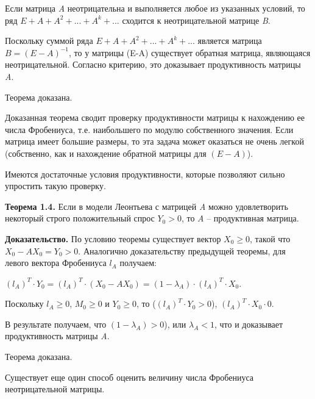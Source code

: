 \documentclass[12pt, 4paper]{book}
\begin{document}
{Если матрица \textit{A} неотрицательна и выполняется любое из указанных условий, то ряд $ E + A + A^2 + ... + A^k + ... $ сходится к неотрицательной матрице \textit{B}.
\par

Поскольку суммой ряда $ E + A + A^2 + ... + A^k + ... $ является матрица $ B = (E - A) ^{-1} $, то у матрицы (E-A) существует обратная матрица, являющаяся неотрицательной. Согласно критерию, это доказывает продуктивность матрицы \textit{A}.
\par

Теорема доказана.
\par

Доказанная теорема сводит проверку продуктивности матрицы к нахождению ее числа Фробениуса, т.е. наибольшего по модулю собственного значения. Если матрица  имеет большие размеры, то эта задача может оказаться не очень легкой (собственно, как и нахождение обратной матрицы для $ (E - A) $).
\par

Имеются достаточные условия продуктивности, которые позволяют сильно упростить такую проверку.
\par

\textbf{Теорема 1.4.} Если в модели Леонтьева с матрицей \textit{A} можно удовлетворить некоторый строго положительный спрос $ Y_0 > 0 $, то \textit{A} – продуктивная матрица.
\par

\textbf{Доказательство.} По условию теоремы существует вектор $ X_0 \geq 0 $, такой что $ X_0 - AX_0 = Y_0 > 0 $. Аналогично доказательству предыдущей теоремы, для левого вектора Фробениуса $ l_A $ получаем:
\begin{center}
$ (l_A)^T \cdot Y_0 = (l_A)^T \cdot (X_0 - A X_0) = (1 - \lambda_A) \cdot (l_A)^T \cdot X_0$.
\end{center}
\par

Поскольку $ l_A \geq 0 $, $ M_0 \geq 0 $ и $ Y_0 \geq 0 $, то ($ (l_A)^T \cdot Y_0 > 0$), $ (l_A)^T \cdot X_0 \cdot 0 $.
\par

В результате получаем, что $ (1 - \lambda_A ) > 0$), или $ \lambda_A < 1 $, что и доказывает продуктивность матрицы \textit{A}.
\par

Теорема доказана.
\par

Существует еще один способ оценить величину числа Фробениуса неотрицательной матрицы.
\par

}
\end{document}
